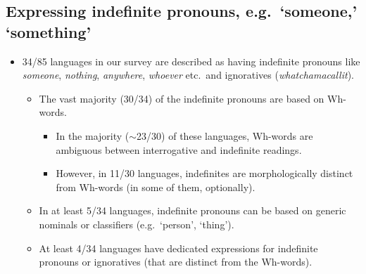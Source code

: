 \documentclass{article}
\makeatletter
\newcommand{\ofy}{/85} %
\makeatother
\begin{document}
\subsection{Expressing indefinite pronouns, e.g.\ `someone,' `something'}
\begin{itemize}
\item 34\ofy{} languages  in our survey are described as having indefinite pronouns like \textit{someone}, \textit{nothing}, \textit{anywhere}, \textit{whoever} etc.\ and ignoratives (\textit{whatchamacallit}).
  \begin{itemize}
  \item The vast majority (30/34) of the  indefinite pronouns are based on Wh-words.
    \begin{itemize}
    \item In the majority ($\sim$23/30) of these languages, Wh-words are  ambiguous between interrogative and indefinite readings.
    \item However, in 11/30 languages, indefinites are morphologically distinct from Wh-words (in some of them, optionally).
    \end{itemize}
  \item In at least 5/34 languages,  indefinite pronouns can be based on generic nominals or classifiers (e.g.\ `person', `thing').
  \item At least 4/34 languages have dedicated expressions for indefinite pronouns or ignoratives (that are distinct from the Wh-words).
  \end{itemize}
\end{itemize}
\end{document}
